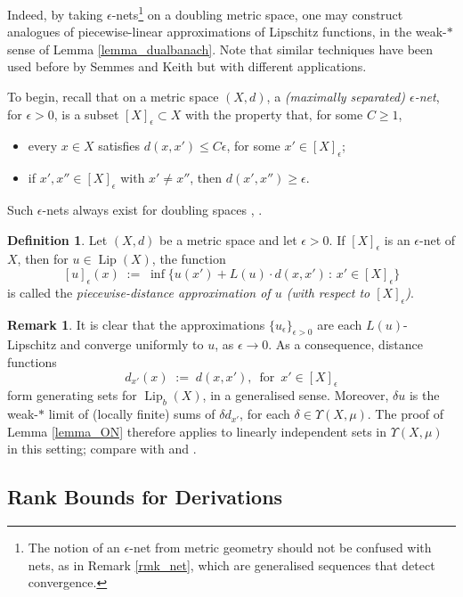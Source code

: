 \documentclass[reqno]{amsart}
\theoremstyle{plain}
\theoremstyle{definition}
\newtheorem{defn}[thm]{Definition}
\newtheorem{rmk}[thm]{Remark}
\theoremstyle{remark}
\numberwithin{equation}{section}
\renewcommand{\d}{\delta}
\newcommand{\e}{\epsilon}
\newcommand{\Lip}{\operatorname{Lip}}
\newcommand{\U}{\Upsilon}
\begin{document}
Indeed, by taking $\e$-nets\footnote{The notion of an $\e$-net from metric geometry should not be confused with nets, as in Remark \ref{rmk_net}, which are generalised sequences that detect convergence.} on a doubling metric space, one may construct analogues of piecewise-linear approximations of Lipschitz functions, in the weak-$*$ sense of Lemma \ref{lemma_dualbanach}.  Note that similar techniques have been used before by Semmes \cite[Eq.\ B.6.24]{Gromov:book} and Keith \cite[Defn 4.1]{Keith-distvectors} but with different applications.

To begin, recall that on a metric space $(X,d)$, a {\em (maximally separated) $\e$-net}, for $\e > 0$, is a subset $[X]_\e \subset X$ with the property that, for some $C \geq 1$, 
\begin{itemize}
\item every $x \in X$ satisfies $d(x,x') \leq C\e$, for some $x' \in [X]_\e$;
\item if $x',x'' \in [X]_\e$ with $x' \neq x''$, then $d(x',x'') \geq \e$.
\end{itemize}

Such $\e$-nets always exist for doubling spaces \cite{Christ}, \cite[Lemma B.7.3]{Gromov:book}.

\begin{defn} %
Let $(X,d)$ be a metric space and let $\e > 0$.  If $[X]_\e$ is an $\e$-net of $X$, then for $u \in \Lip(X)$, the function
$$
[u]_\e(x) \;:=\; \inf \big\{ u(x') + L(u) \cdot d(x,x') \,:\, x' \in [X]_\e \big\}
$$
is called the {\em piecewise-distance approximation of $u$ (with respect to $[X]_\e$)}.
\end{defn}

\begin{rmk} \label{rmk_gengenerators}
It is clear that the approximations $\{u_\e\}_{\e > 0}$ are each $L(u)$-Lipschitz and converge uniformly to $u$, as $\e \to 0$.  As a consequence, distance functions 
$$
d_{x'}(x) \;:=\; d(x,x'), \, \text{ for } \, x' \in [X]_\e
$$
form generating sets for $\Lip_b(X)$, in a generalised sense.  Moreover, $\d u$ is the weak-$*$ limit of (locally finite) sums of ${\d}d_{x'}$, for each $\d \in \U(X,\mu)$.  The proof of Lemma \ref{lemma_ON} therefore applies to linearly independent sets in $\U(X,\mu)$ in this setting; compare with \cite[Rmk 7.3.2]{Keith} and \cite[Cor 6.28]{Schioppa}.
\end{rmk}

\subsection{Rank Bounds for Derivations}
\end{document}
